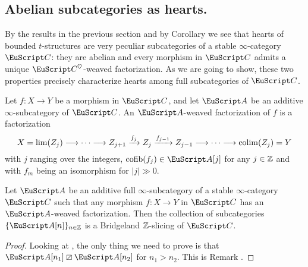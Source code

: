 \subsection{Abelian subcategories as hearts.}
By the results in the previous section and by Corollary  we see that hearts of bounded $t$-structures are very peculiar subcategories of a stable $\infty$-category $\C$: they are abelian and every morphism in $\C$ admits a unique $\C^\heart$-weaved factorization. As we are going to show, these two properties precisely characterize hearts among full subcategories of $\C$.
\begin{definition}
Let $f\colon X\to Y$ be a morphism in $\C$, and let $\cA$ be an additive $\infty$-subcategory of $\C$. An $\cA$-weaved factorization of $f$ is a factorization
\[
X=\lim(Z_j) \longrightarrow\cdots \longrightarrow Z_{j+1} \xrightarrow{f_{j}} Z_{j} \xrightarrow{f_{j-1}}Z_{j-1}\longrightarrow \cdots\longrightarrow \mathrm{colim}(Z_j)=Y
\]
with $j$ ranging over the integers, $\cofib(f_j)\in \cA[j]$ for any $j\in \mathbb{Z} $ and with $f_m$ being an isomorphism for $|j|\gg 0$.
\end{definition}

\begin{proposition}
Let $\cA$ be an additive full $\infty$-subcategory of a stable $\infty$-category $\C$ such that any morphism $f\colon X\to Y$  in $\C$ has an $\cA$-weaved factorization. Then the collection of subcategories $\{\cA[n]\}_{n\in \Z}$ is a Bridgeland $\mathbb{Z}$-slicing of $\C$.
\end{proposition}
\begin{proof} Looking at \adef{}, the only thing we need to prove is that $\cA[n_1]\orth\cA[n_2]$ for $n_1>n_2$. This is Remark .
\end{proof}


